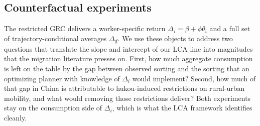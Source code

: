 %

\subsection{Counterfactual experiments}\label{sec:counterfactuals}

The restricted GRC delivers a worker-specific return $\Delta_i = \beta + \phi\theta_i$ and a full set of trajectory-conditional averages $\Delta_{\underline{d}}$.
We use these objects to address two questions that translate the slope and intercept of our LCA line into magnitudes that the migration literature presses on.
First, how much aggregate consumption is left on the table by the gap between observed sorting and the sorting that an optimizing planner with knowledge of $\Delta_i$ would implement?
Second, how much of that gap in China is attributable to hukou-induced restrictions on rural-urban mobility, and what would removing those restrictions deliver?
Both experiments stay on the consumption side of $\Delta_i$, which is what the LCA framework identifies cleanly.

